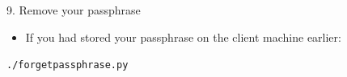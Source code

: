 \documentclass[landscape]{slides}
\newcommand{\heading}[1]{{\fontseries{b}\selectfont\begin{center}{\LARGE\color{red} #1}\end{center}}}
\newcommand{\code}[1]{\begin{center}{\tt #1}\end{center}}
\begin{document}
\begin{slide}
\heading{9. Remove your passphrase}
\begin{itemize}
\item If you had stored your passphrase on the client machine earlier:
\end{itemize}
\code{./forgetpassphrase.py}
\end{slide}

\end{document}
